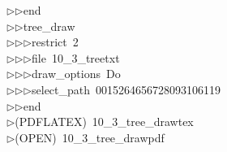 \begin{tabbing}
$\triangleright$\>$\triangleright$\>end\ \\[0pt]
$\triangleright$\>$\triangleright$\>tree\_draw\ \\[0pt]
$\triangleright$\>$\triangleright$\>$\triangleright$\>restrict\ 2\ \\[0pt]
$\triangleright$\>$\triangleright$\>$\triangleright$\>file\ 10\_3\_treetxt\ \\[0pt]
$\triangleright$\>$\triangleright$\>$\triangleright$\>draw\_options\ Do\ \\[0pt]
$\triangleright$\>$\triangleright$\>$\triangleright$\>select\_path\ 0015264656728093106119\ \\[0pt]
$\triangleright$\>$\triangleright$\>end\\[0pt]
$\triangleright$\>(PDFLATEX)\ 10\_3\_tree\_drawtex\\[0pt]
$\triangleright$\>(OPEN)\ 10\_3\_tree\_drawpdf\\[0pt]
\end{tabbing}

